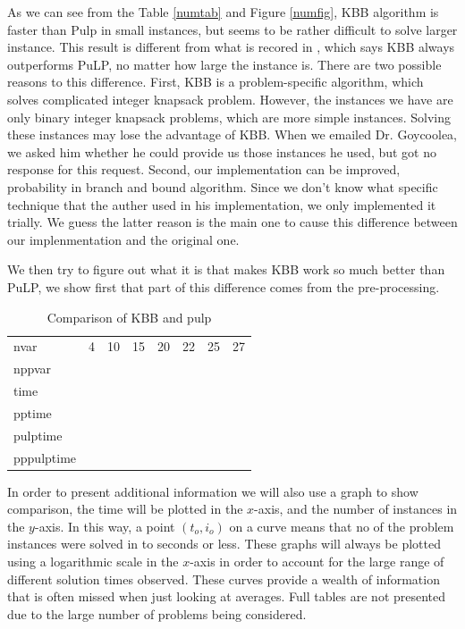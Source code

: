 \documentclass[a4paper,11pt]{article}
\begin{document}
As we can see from the Table \ref{numtab} and Figure \ref{numfig}, KBB algorithm is faster than Pulp in small instances, but seems to be rather difficult to solve larger instance. This result is different from what is recored in \cite{fukasawa2011exact}, which says KBB always outperforms PuLP, no matter how large the instance is. There are two possible reasons to this difference. First, KBB is a problem-specific algorithm, which solves complicated integer knapsack problem. However, the instances we have are only binary integer knapsack problems, which are more simple instances. Solving these instances may lose the advantage of KBB. When we emailed Dr. Goycoolea, we asked him whether he could provide us those instances he used, but got no response for this request. Second, our implementation can be improved, probability in branch and bound algorithm. Since we don't know what specific technique that the auther used in his implementation, we only implemented it trially. We guess the latter reason is the main one to cause this difference between our implenmentation and the original one.

We then try to figure out what it is that makes KBB work so much better than PuLP,  we show first that part of this difference comes from the pre-processing.
\begin{table}[H]
\begin{center}
\begin{tabular}{l c c c c c c c}
\hline
nvar&4&10&15&20&22&25&27\\
nppvar\\
time\\
pptime\\
pulptime\\
pppulptime\\
\hline
\end{tabular}
\end{center}
\caption{Comparison of KBB and pulp\label{numtabp}}
\end{table}

In order to present additional information we will also use a graph to show comparison, the time will be plotted in the $x$-axis, and the number of instances in the $y$-axis. In this way, a point $(t_o,i_o)$ on a curve means that no of the problem instances were solved in to seconds or less. These graphs will always be plotted using a logarithmic scale in the $x$-axis in order to account for the large range of different solution times observed. These curves provide a wealth of information that is often missed when just looking at averages. Full tables are not presented due to the large number of problems being considered.
\end{document}
